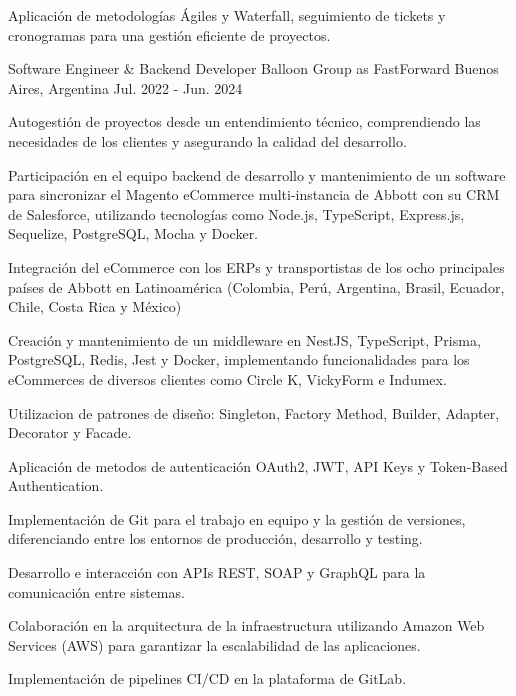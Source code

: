 \begin{cventries}
{\begin{cvitems}
        \item {Aplicación de metodologías Ágiles y Waterfall, seguimiento de tickets y cronogramas para una gestión eficiente de proyectos.}
      \end{cvitems}
    }
  \vspace{5.5mm}
\cventry
    {Software Engineer \& Backend Developer} %
    {Balloon Group as FastForward} %
    {Buenos Aires, Argentina} %
    {Jul. 2022 - Jun. 2024} %
    {
      \begin{cvitems} %
        \item {Autogestión de proyectos desde un entendimiento técnico, comprendiendo las necesidades de los clientes y asegurando la calidad del desarrollo.}
        \item {Participación en el equipo backend de desarrollo y mantenimiento de un software para sincronizar el Magento eCommerce multi-instancia de Abbott con su CRM de Salesforce, utilizando tecnologías como Node.js, TypeScript, Express.js, Sequelize, PostgreSQL, Mocha y Docker.}
        \item {Integración del eCommerce con los ERPs y transportistas de los ocho principales países de Abbott en Latinoamérica (Colombia, Perú, Argentina, Brasil, Ecuador, Chile, Costa Rica y México)}
        \item {Creación y mantenimiento de un middleware en NestJS, TypeScript, Prisma, PostgreSQL, Redis, Jest y Docker, implementando funcionalidades para los eCommerces de diversos clientes como Circle K, VickyForm e Indumex.}
        \item {Utilizacion de patrones de diseño: Singleton, Factory Method, Builder, Adapter, Decorator y Facade.}
        \item {Aplicación de metodos de autenticación OAuth2, JWT, API Keys y Token-Based Authentication.}
        \item {Implementación de Git para el trabajo en equipo y la gestión de versiones, diferenciando entre los entornos de producción, desarrollo y testing.}
        \item {Desarrollo e interacción con APIs REST, SOAP y GraphQL para la comunicación entre sistemas.}
        \item {Colaboración en la arquitectura de la infraestructura utilizando Amazon Web Services (AWS) para garantizar la escalabilidad de las aplicaciones.}
        \item {Implementación de pipelines CI/CD en la plataforma de GitLab.}

\end{cvitems}}
\end{cventries}
